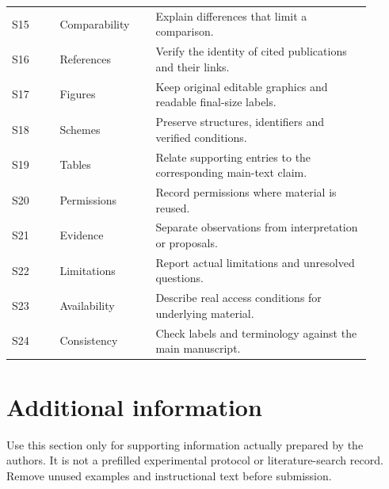 \documentclass[a4paper,11pt]{article}
\begin{document}
\begin{longtable}{@{}p{0.12\linewidth}p{0.24\linewidth}>{\raggedright\arraybackslash}p{0.54\linewidth}@{}}
S15 & Comparability & Explain differences that limit a comparison.\\
S16 & References & Verify the identity of cited publications and their links.\\
S17 & Figures & Keep original editable graphics and readable final-size labels.\\
S18 & Schemes & Preserve structures, identifiers and verified conditions.\\
S19 & Tables & Relate supporting entries to the corresponding main-text claim.\\
S20 & Permissions & Record permissions where material is reused.\\
S21 & Evidence & Separate observations from interpretation or proposals.\\
S22 & Limitations & Report actual limitations and unresolved questions.\\
S23 & Availability & Describe real access conditions for underlying material.\\
S24 & Consistency & Check labels and terminology against the main manuscript.\\
\end{longtable}
\endgroup

\section{Additional information}\label{sec:si-additional}
Use this section only for supporting information actually prepared by the
authors. It is not a prefilled experimental protocol or literature-search
record. Remove unused examples and instructional text before submission.



\end{document}
